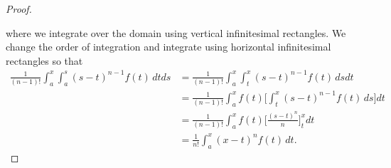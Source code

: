 \documentclass[12pt]{article}
\theoremstyle{definition}
\begin{document}
\begin{proof}
\begin{center}
\end{center}
%
where we integrate over the domain using vertical infinitesimal rectangles. We change the order of integration and integrate using horizontal infinitesimal rectangles so that
%
\begin{align*}
\frac{1}{(n-1)!}\int_a^x \int_a^s (s-t)^{n-1} f(t)\, dt ds
&= \frac{1}{(n-1)!}\int_a^x  \int_t^x (s-t)^{n-1} f(t)\, ds dt \\
&= \frac{1}{(n-1)!}\int_a^x f(t) \bigg[\int_t^x (s-t)^{n-1} f(t)\, ds\bigg] dt \\
&= \frac{1}{(n-1)!} \int_a^x f(t)\bigg[\frac{(s-t)^n}{n}\bigg]^x_t dt \\
&= \frac{1}{n!} \int_a^x (x-t)^n f(t)\, dt.
\end{align*}
\end{proof}
\end{document}
